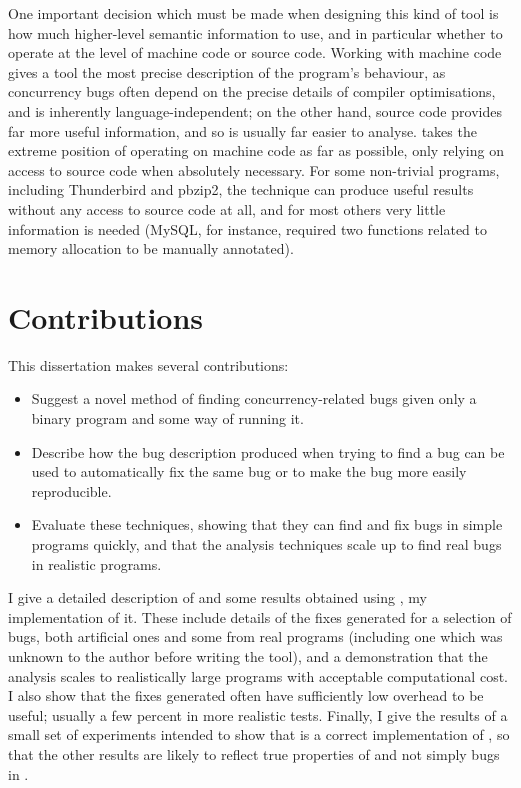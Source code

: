 One important decision which must be made when designing this kind of
tool is how much higher-level semantic information to use, and in
particular whether to operate at the level of machine code or source
code.  Working with machine code gives a tool the most precise
description of the program's behaviour, as concurrency bugs often
depend on the precise details of compiler optimisations, and is
inherently language-independent; on the other hand, source code
provides far more useful information, and so is usually far easier to
analyse.  {\Technique} takes the extreme position of operating on
machine code as far as possible, only relying on access to source code
when absolutely necessary.  For some non-trivial programs, including
Thunderbird and pbzip2, the technique can produce useful results
without any access to source code at all, and for most others very
little information is needed (MySQL, for instance, required two
functions related to memory allocation to be manually annotated).

\section{Contributions}

This dissertation makes several contributions:

\begin{itemize}
\item
  Suggest a novel method of finding concurrency-related bugs given
  only a binary program and some way of running it.
\item
  Describe how the bug description produced when trying to find a bug
  can be used to automatically fix the same bug or to make the bug
  more easily reproducible.
\item
  Evaluate these techniques, showing that they can find and fix bugs
  in simple programs quickly, and that the analysis techniques scale
  up to find real bugs in realistic programs.
\end{itemize}

I give a detailed description of {\technique} and some results
obtained using \implementation, my implementation of it.  These
include details of the fixes generated for a selection of bugs, both
artificial ones and some from real programs (including one which was
unknown to the author before writing the tool), and a demonstration
that the analysis scales to realistically large programs with
acceptable computational cost.  I also show that the fixes generated
often have sufficiently low overhead to be useful; usually a few
percent in more realistic tests.  Finally, I give the results of a
small set of experiments intended to show that \implementation{} is a
correct implementation of \technique{}, so that the other results are
likely to reflect true properties of {\technique} and not simply bugs
in {\implementation}.

